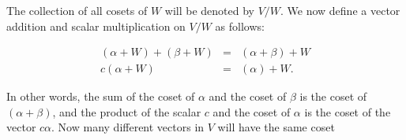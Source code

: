 The collection of all cosets of \(W\) will be denoted by \(V/W\). We now define a vector addition and scalar multiplication on \(V/W\) as follows:

\[\begin{array}{rcl}(\alpha+W)+(\beta+W)&=&(\alpha+\beta)+W\\ c(\alpha+W)&=&(\alpha)+W.\end{array}\]

In other words, the sum of the coset of \(\alpha\) and the coset of \(\beta\) is the coset of \((\alpha+\beta)\), and the product of the scalar \(c\) and the coset of \(\alpha\) is the coset of the vector \(c\alpha\). Now many different vectors in \(V\) will have the same coset 